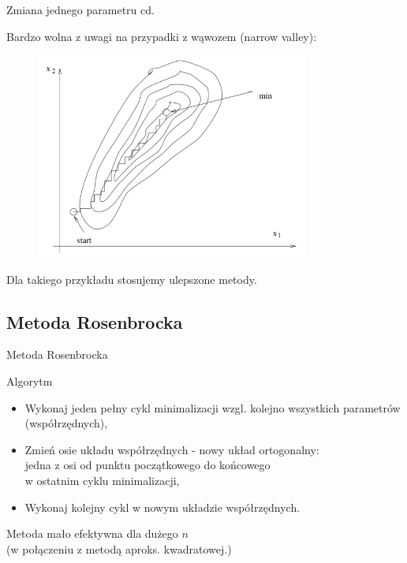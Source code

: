   \begin{frame}{Zmiana jednego parametru cd.}

	Bardzo wolna z uwagi na przypadki z wąwozem (narrow valley):
	\begin{figure}
		\centering
		\includegraphics[height=0.6\textheight ,width=0.8\textwidth]{img/17/change_param_2}
	\end{figure}
	Dla takiego przykładu stosujemy ulepszone metody.

  \end{frame}

\subsection{Metoda Rosenbrocka}

  \begin{frame}{Metoda Rosenbrocka}

    \begin{block}{Algorytm}
 	  \begin{itemize}
   		\item Wykonaj jeden pełny cykl minimalizacji wzgl. kolejno wszystkich parametrów (współrzędnych),
   		\item Zmień osie układu współrzędnych - nowy układ ortogonalny:
   		\\jedna z osi od punktu początkowego do końcowego
   		\\w ostatnim cyklu minimalizacji,
   		\item Wykonaj kolejny cykl w nowym układzie współrzędnych.
  	\end{itemize}
  	\end{block}
  	  Metoda mało efektywna dla dużego $n$
  	  \\(w połączeniu z metodą aproks. kwadratowej.)

  \end{frame}

